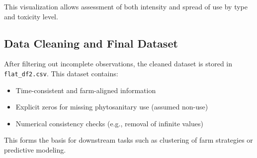 \documentclass[a4paper,12pt]{article}
\begin{document}
This visualization allows assessment of both intensity and spread of use by type and toxicity level.

\subsection{Data Cleaning and Final Dataset}
After filtering out incomplete observations, the cleaned dataset is stored in \texttt{flat\_df2.csv}. This dataset contains:
\begin{itemize}
    \item Time-consistent and farm-aligned information
    \item Explicit zeros for missing phytosanitary use (assumed non-use)
    \item Numerical consistency checks (e.g., removal of infinite values)
\end{itemize}

This forms the basis for downstream tasks such as clustering of farm strategies or predictive modeling.
\end{document}
